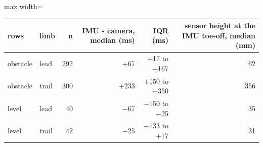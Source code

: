 \begin{adjustbox}{max width=\textwidth}
{\small
\begin{tabular}{llrrrr}
\toprule
\textbf{rows} & \textbf{limb} & \textbf{n} & \textbf{IMU - camera, median (ms)} & \textbf{IQR (ms)} & \textbf{sensor height at the IMU toe-off, median (mm)} \\
\midrule
obstacle & lead & 292 & +67 & +17 to +167 & 62 \\
obstacle & trail & 300 & +233 & +150 to +350 & 356 \\
level & lead & 40 & $-$67 & $-$150 to $-$25 & 35 \\
level & trail & 42 & $-$25 & $-$133 to +17 & 31 \\
\bottomrule
\end{tabular}
}
\end{adjustbox}
